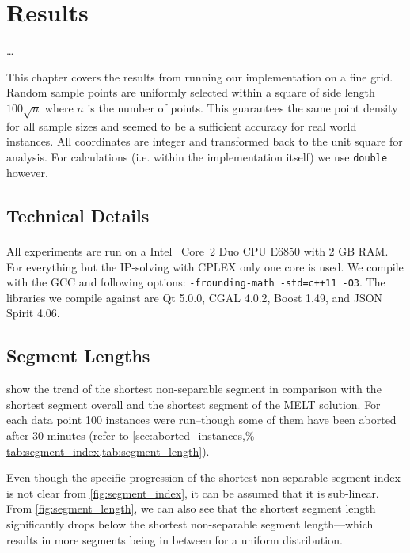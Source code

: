 \chapter{Results}
\ldots{}

This chapter covers the results from running our implementation on a
fine grid. Random sample points are uniformly selected within a
square of side length \(100 \sqrt{n}\) where \(n\) is the number of
points. This guarantees the same point density for all sample sizes
and seemed to be a sufficient accuracy for real world instances.
All coordinates are integer and transformed back to the unit
square for analysis. For calculations (i.e. within the implementation
itself) we use \verb|double| however.

\section{Technical Details}
All experiments are run on a Intel\textsuperscript{\textregistered}~%
Core\texttrademark~2 Duo CPU E6850 with 2 GB RAM. For everything but
the IP-solving with CPLEX only one core is used. We compile with the
GCC and following options: \verb|-frounding-math -std=c++11 -O3|. The
libraries we compile against are Qt 5.0.0, CGAL 4.0.2, Boost 1.49,
and JSON Spirit 4.06.

\section{Segment Lengths}
 show the trend of
the shortest non-separable segment in comparison with the shortest
segment overall and the shortest segment of the \gls{MELT} solution.
For each data point 100 instances were run--though some of them have
been aborted after 30 minutes (refer to \cref{sec:aborted_instances,%
tab:segment_index,tab:segment_length}).

Even though the specific progression of the shortest non-separable
segment index is not clear from \cref{fig:segment_index}, it can be
assumed that it is sub-linear. From \cref{fig:segment_length}, we can
also see that the shortest segment length significantly drops below
the shortest non-separable segment length---which results in more
segments being in between for a uniform distribution.

